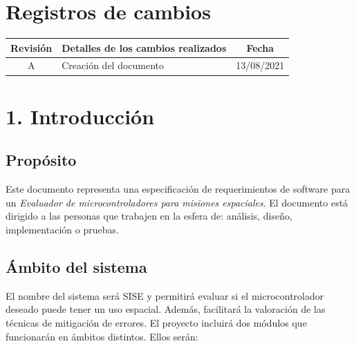 \documentclass[
11pt, %
codirector, %
]{charter}
\begin{document}
\maketitle
\thispagestyle{empty}
\pagebreak


\thispagestyle{empty}
{\setlength{\parskip}{0pt}
\tableofcontents{}
}
\pagebreak


\section*{Registros de cambios}
\label{sec:registro}

\begin{table}[ht]
\label{tab:registro}
\centering
\begin{tabularx}{\linewidth}{@{}|c|X|c|@{}}
\hline
\rowcolor[HTML]{C0C0C0} 
Revisión & \multicolumn{1}{c|}{\cellcolor[HTML]{C0C0C0}Detalles de los cambios realizados} & Fecha      \\ \hline
A & Creación del documento & 13/08/2021 \\ \hline
\end{tabularx}
\end{table}

\pagebreak

\section{1. Introducción}
\label{sec:introduccion}

\subsection{Propósito}
\label{sub:proposito}

Este documento representa una especificación de requerimientos de software para un \emph{Evaluador de microcontroladores para misiones espaciales}.
El documento está dirigido a las personas que trabajen en la esfera de: análisis, diseño, implementación o pruebas.

\subsection{Ámbito del sistema}
\label{sub:ambito}

El nombre del sistema será SISE y permitirá evaluar si el microcontrolador deseado puede tener un uso espacial.
Además, facilitará la valoración de las técnicas de mitigación de errores.
El proyecto incluirá dos módulos que funcionarán en ámbitos distintos.
Ellos serán:
\end{document}
